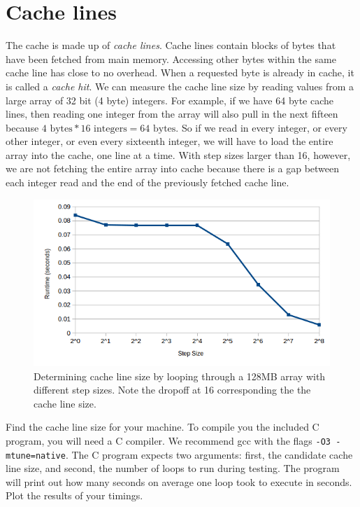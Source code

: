 \section*{Cache lines}
The cache is made up of \emph{cache lines}.
Cache lines contain blocks of bytes that have been fetched from main memory.
Accessing other bytes within the same cache line has close to no overhead.
When a requested byte is already in cache, it is called a \emph{cache hit}.
We can measure the cache line size by reading values from a large array of 32 bit (4 byte) integers.
For example, if we have 64 byte cache lines, then reading one integer from the array will also pull in the next fifteen because $4 \mbox{~bytes} * 16 \mbox{~integers} = 64 \mbox{~bytes}$.
So if we read in every integer, or every other integer, or even every sixteenth integer, we will have to load the entire array into the cache, one line at a time.
With step sizes larger than 16, however, we are not fetching the entire array into cache because there is a gap between each integer read and the end of the previously fetched cache line.
\begin{figure}[h]
\centering
\includegraphics[width=\textwidth]{cache_line.png}
\caption{Determining cache line size by looping through a 128MB array with different step sizes. Note the dropoff at 16 corresponding the the cache line size.}
\label{fig:linesize}
\end{figure}

\begin{problem}
Find the cache line size for your machine.
To compile you the included C program, you will need a C compiler.
We recommend gcc with the flags \texttt{-O3 -mtune=native}.
The C program expects two arguments: first, the candidate cache line size, and second, the number of loops to run during testing.
The program will print out how many seconds on average one loop took to execute in seconds.
Plot the results of your timings.
\label{prob:cacheline}
\end{problem}

